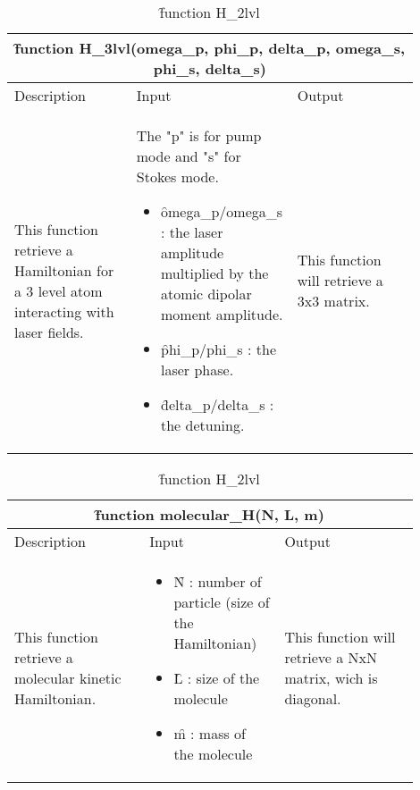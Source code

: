 \documentclass[1pt, a4paper]{article}
\begin{document}
\begin{table}[htbp]
    \begin{center}
        \begin{tabular}{p{0.3\linewidth} p{0.3\linewidth} p{0.3\linewidth}} \toprule
            \multicolumn{3}{c}{\f{function H_3lvl(omega_p, phi_p, delta_p, omega_s, phi_s, delta_s)}}\\
            \midrule
            \hfil Description & \hfil Input & \hfil Output\\
            \cmidrule(r){1-1} \cmidrule{2-2} \cmidrule(l){3-3}
           
            This function retrieve a Hamiltonian for a 3 level atom interacting with laser fields.&
            The "p" is for pump mode and "s" for Stokes mode.
            \begin{itemize}[leftmargin=15pt, itemsep=0pt, topsep=0pt]
            \item \f{omega_p/omega_s} : the laser amplitude multiplied by the atomic dipolar moment amplitude.
            \item \f{phi_p/phi_s} : the laser phase.
            \item \f{delta_p/delta_s} : the detuning.
            \end{itemize}
            &
            This function will retrieve a 3x3 matrix.\\
            \bottomrule
        \end{tabular}
    \end{center}
    \caption{\f{function H_2lvl}}
    \label{tab:H3lvl}
\end{table}
\begin{table}[htbp]
    \begin{center}
        \begin{tabular}{p{0.3\linewidth} p{0.3\linewidth} p{0.3\linewidth}} \toprule
            \multicolumn{3}{c}{\f{function molecular_H(N, L, m)}}\\
            \midrule
            \hfil Description & \hfil Input & \hfil Output\\
            \cmidrule(r){1-1} \cmidrule{2-2} \cmidrule(l){3-3}
           
            This function retrieve a molecular kinetic Hamiltonian.&
            \vspace*{-8pt}
            \begin{itemize}[leftmargin=15pt, itemsep=0pt, topsep=0pt]
            \item \f{N} : number of particle (size of the Hamiltonian)
            \item \f{L} : size of the molecule
            \item \f{m} : mass of the molecule
            \end{itemize}
            &
            This function will retrieve a NxN matrix, wich is diagonal.\\
            \bottomrule
        \end{tabular}
    \end{center}
    \caption{\f{function H_2lvl}}
    \label{tab:mol_H}
\end{table}
\end{document}
